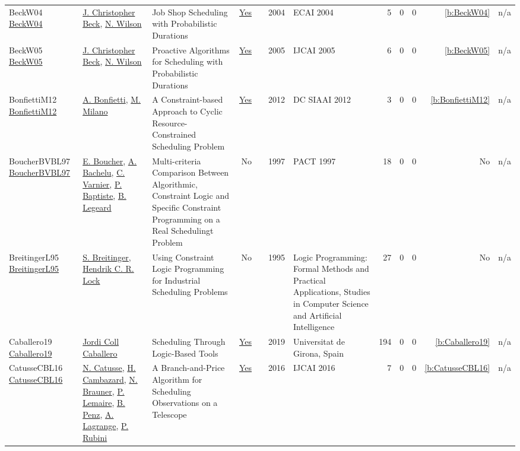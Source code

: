 {\begin{longtable}{>{\raggedright\arraybackslash}p{3cm}>{\raggedright\arraybackslash}p{6cm}>{\raggedright\arraybackslash}p{6.5cm}rrrp{2.5cm}rrrrr}
BeckW04 \href{}{BeckW04} & \hyperref[auth:a89]{J. Christopher Beck}, \hyperref[auth:a832]{N. Wilson} & Job Shop Scheduling with Probabilistic Durations & \href{../works/BeckW04.pdf}{Yes} & \cite{BeckW04} & 2004 & ECAI 2004 & 5 & 0 & 0 & \ref{b:BeckW04} & n/a\\
BeckW05 \href{http://ijcai.org/Proceedings/05/Papers/0748.pdf}{BeckW05} & \hyperref[auth:a89]{J. Christopher Beck}, \hyperref[auth:a832]{N. Wilson} & Proactive Algorithms for Scheduling with Probabilistic Durations & \href{../works/BeckW05.pdf}{Yes} & \cite{BeckW05} & 2005 & IJCAI 2005 & 6 & 0 & 0 & \ref{b:BeckW05} & n/a\\
BonfiettiM12 \href{https://ceur-ws.org/Vol-926/paper2.pdf}{BonfiettiM12} & \hyperref[auth:a203]{A. Bonfietti}, \hyperref[auth:a144]{M. Milano} & A Constraint-based Approach to Cyclic Resource-Constrained Scheduling Problem & \href{../works/BonfiettiM12.pdf}{Yes} & \cite{BonfiettiM12} & 2012 & DC SIAAI 2012 & 3 & 0 & 0 & \ref{b:BonfiettiM12} & n/a\\
BoucherBVBL97 \href{}{BoucherBVBL97} & \hyperref[auth:a696]{E. Boucher}, \hyperref[auth:a697]{A. Bachelu}, \hyperref[auth:a698]{C. Varnier}, \hyperref[auth:a699]{P. Baptiste}, \hyperref[auth:a700]{B. Legeard} & Multi-criteria Comparison Between Algorithmic, Constraint Logic and Specific Constraint Programming on a Real Schedulingt Problem & No & \cite{BoucherBVBL97} & 1997 & PACT 1997 & 18 & 0 & 0 & No & n/a\\
BreitingerL95 \href{}{BreitingerL95} & \hyperref[auth:a701]{S. Breitinger}, \hyperref[auth:a702]{Hendrik C. R. Lock} & Using Constraint Logic Programming for Industrial Scheduling Problems & No & \cite{BreitingerL95} & 1995 & Logic Programming: Formal Methods and Practical Applications, Studies in Computer Science and Artificial Intelligence & 27 & 0 & 0 & No & n/a\\
Caballero19 \href{https://www.tesisenred.net/handle/10803/667963#page=1}{Caballero19} & \hyperref[auth:a102]{Jordi Coll Caballero} & Scheduling Through Logic-Based Tools & \href{../works/Caballero19.pdf}{Yes} & \cite{Caballero19} & 2019 & Universitat de Girona, Spain & 194 & 0 & 0 & \ref{b:Caballero19} & n/a\\
CatusseCBL16 \href{http://www.ijcai.org/Abstract/16/434}{CatusseCBL16} & \hyperref[auth:a1010]{N. Catusse}, \hyperref[auth:a1011]{H. Cambazard}, \hyperref[auth:a1012]{N. Brauner}, \hyperref[auth:a989]{P. Lemaire}, \hyperref[auth:a1013]{B. Penz}, \hyperref[auth:a1014]{A. Lagrange}, \hyperref[auth:a1015]{P. Rubini} & A Branch-and-Price Algorithm for Scheduling Observations on a Telescope & \href{../works/CatusseCBL16.pdf}{Yes} & \cite{CatusseCBL16} & 2016 & IJCAI 2016 & 7 & 0 & 0 & \ref{b:CatusseCBL16} & n/a\\

\end{longtable}}
